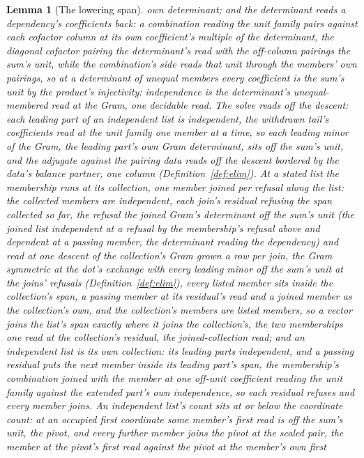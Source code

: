 \documentclass[11pt]{article}
\newtheorem{lemma}{Lemma}
\theoremstyle{definition}
\begin{document}
\begin{lemma}[The lowering span]
own determinant; and the determinant reads a dependency's
coefficients back: a combination reading the unit family pairs
against each cofactor column at its own coefficient's multiple of
the determinant, the diagonal cofactor pairing the determinant's
read with the off-column pairings the sum's unit, while the
combination's side reads that unit through the members' own
pairings, so at a determinant of unequal members every
coefficient is the sum's unit by the product's injectivity:
independence is the determinant's unequal-membered read at the
Gram, one decidable read. The solve reads off the descent: each
leading part of an independent list is independent, the withdrawn
tail's coefficients read at the unit family one member at a time,
so each leading minor of the Gram, the leading part's own Gram
determinant, sits off the sum's unit, and the adjugate against the
pairing data reads off the descent bordered by the data's
balance partner, one column (Definition~\ref{def:elim}). At a
stated list the membership runs at
its \emph{collection}, one member joined per refusal along the
list: the collected members are independent, each join's residual
refusing the span collected so far, the refusal the joined Gram's
determinant off the sum's unit (the joined list independent at a
refusal by the membership's refusal above and dependent at a
passing member, the determinant reading the dependency) and read
at one descent of the collection's Gram grown a row per join, the
Gram symmetric at the dot's exchange with every leading minor off
the sum's unit at the joins' refusals (Definition~\ref{def:elim}),
every listed member sits
inside the collection's span, a passing member at its residual's
read and a joined member as the collection's own, and the
collection's members are listed members, so a vector joins the
list's span exactly where it joins the collection's, the two
memberships one read at the collection's residual, the
joined-collection read; and an independent list is its own
collection: its leading parts independent, and a passing residual
puts the next member inside its leading part's span, the membership's
combination joined with the member at one off-unit coefficient
reading the unit family against the extended part's own
independence, so each residual refuses and every member joins. An independent list's count sits at or below the
coordinate count: at an occupied first coordinate some member's
first read is off the sum's unit, the pivot, and every further
member joins the pivot at the scaled pair, the member at the
pivot's first read against the pivot at the member's own first

\end{lemma}
\end{document}
